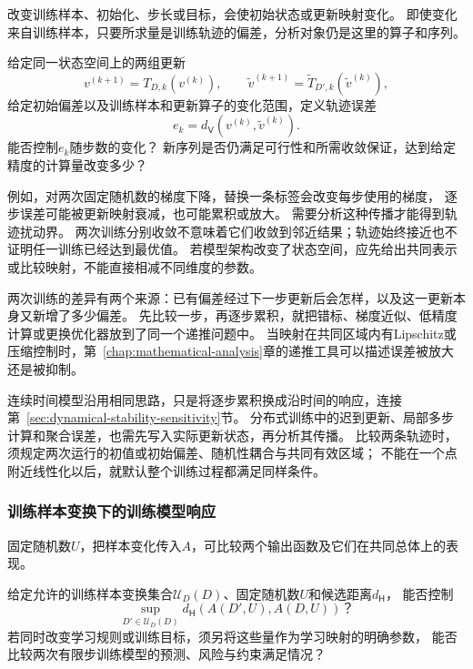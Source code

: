 改变训练样本、初始化、步长或目标，会使初始状态或更新映射变化。
即使变化来自训练样本，只要所求量是训练轨迹的偏差，分析对象仍是这里的算子和序列。

\begin{mathproblem}[训练轨迹对训练样本和学习规则的响应]
  \label{question:future-iteration-perturbation}
  给定同一状态空间上的两组更新
  \[
    v^{(k+1)}=T_{D,k}(v^{(k)}),\qquad
    \widetilde v^{(k+1)}=\widetilde T_{D',k}(\widetilde v^{(k)}),
  \]
  给定初始偏差以及训练样本和更新算子的变化范围，定义轨迹误差
  \[
    e_k=d_{\mathsf V}(v^{(k)},\widetilde v^{(k)}).
  \]
  能否控制$e_k$随步数的变化？
  新序列是否仍满足可行性和所需收敛保证，达到给定精度的计算量改变多少？
\end{mathproblem}

例如，对两次固定随机数的梯度下降，替换一条标签会改变每步使用的梯度，
逐步误差可能被更新映射衰减，也可能累积或放大。
需要分析这种传播才能得到轨迹扰动界。
两次训练分别收敛不意味着它们收敛到邻近结果；轨迹始终接近也不证明任一训练已经达到最优值。
若模型架构改变了状态空间，应先给出共同表示或比较映射，不能直接相减不同维度的参数。

两次训练的差异有两个来源：已有偏差经过下一步更新后会怎样，以及这一更新本身又新增了多少偏差。
先比较一步，再逐步累积，就把错标、梯度近似、低精度计算或更换优化器放到了同一个递推问题中。
当映射在共同区域内有Lipschitz或压缩控制时，第~\ref{chap:mathematical-analysis}章的递推工具可以描述误差被放大还是被抑制。

连续时间模型沿用相同思路，只是将逐步累积换成沿时间的响应，连接第~\ref{sec:dynamical-stability-sensitivity}节。
分布式训练中的迟到更新、局部多步计算和聚合误差，也需先写入实际更新状态，再分析其传播。
比较两条轨迹时，须规定两次运行的初值或初始偏差、随机性耦合与共同有效区域；
不能在一个点附近线性化以后，就默认整个训练过程都满足同样条件。

\subsubsection{训练样本变换下的训练模型响应}
\label{sec:future-analysis-perturbation-map}

固定随机数$U$，把样本变化传入$A$，可比较两个输出函数及它们在共同总体上的表现。

\begin{mathproblem}[训练样本变换造成的训练模型差异]
  \label{question:future-perturbation-map}
  给定允许的训练样本变换集合$\mathcal U_D(D)$、固定随机数$U$和候选距离$d_{\mathsf H}$，
  能否控制
  \[
    \sup_{D'\in\mathcal U_D(D)}
      d_{\mathsf H}(A(D',U),A(D,U))\text{？}
  \]
  若同时改变学习规则或训练目标，须另将这些量作为学习映射的明确参数，
  能否比较两次有限步训练模型的预测、风险与约束满足情况？
\end{mathproblem}

